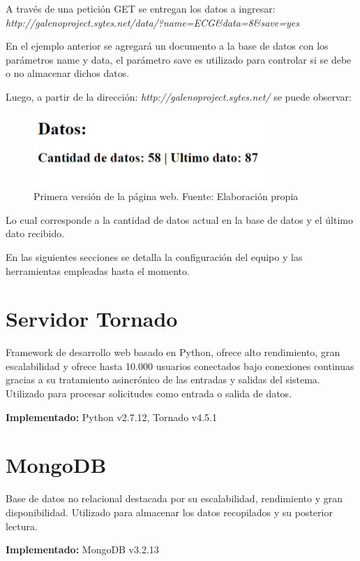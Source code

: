 A través de una petición GET se entregan los datos a ingresar:\\ \textit{http://galenoproject.sytes.net/data/?name=ECG\&data=8\&save=yes}

En el ejemplo anterior se agregará un documento a la base de datos con los parámetros name y data, el parámetro save es utilizado para controlar si se debe o no almacenar dichos datos.

Luego, a partir de la dirección: \textit{http://galenoproject.sytes.net/} se puede observar:

\begin{figure}[H]
	\centering
	\includegraphics[scale=0.6]{figuras/servidor/primera_version.png}
	\caption{Primera versión de la página web. Fuente: Elaboración propia}
	\label{first_example}
\end{figure}

Lo cual corresponde a la cantidad de datos actual en la base de datos y el último dato recibido.



En las siguientes secciones se detalla la configuración del equipo y las herramientas empleadas hasta el momento.

\newpage
\section{Servidor Tornado}
Framework de desarrollo web basado en Python, ofrece alto rendimiento, gran escalabilidad y ofrece hasta 10.000 usuarios conectados bajo conexiones continuas gracias a su tratamiento asincrónico de las entradas y salidas del sistema. Utilizado para procesar solicitudes como entrada o salida de datos.

\textbf{Implementado:} Python v2.7.12, Tornado v4.5.1

\section{MongoDB}
Base de datos no relacional destacada por su escalabilidad, rendimiento y gran disponibilidad. Utilizado para almacenar los datos recopilados y su posterior lectura.

\textbf{Implementado:} MongoDB v3.2.13

